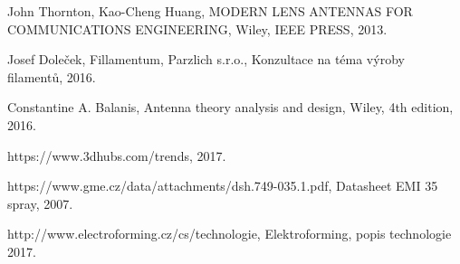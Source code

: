 
\begin{thebibliography}{9}

  John Thornton,
  Kao-Cheng Huang,
  MODERN LENS ANTENNAS FOR COMMUNICATIONS ENGINEERING,
  Wiley,
  IEEE PRESS,
  2013.

  Josef Doleček,
  Fillamentum,
  Parzlich s.r.o.,
  Konzultace na téma výroby filamentů,
  2016.

  Constantine A. Balanis,
  Antenna theory analysis and design,
  Wiley,
  4th edition,
  2016.

  https://www.3dhubs.com/trends,
  2017.

  https://www.gme.cz/data/attachments/dsh.749-035.1.pdf,
  Datasheet EMI 35 spray,
  2007.

  http://www.electroforming.cz/cs/technologie,
  Elektroforming, popis technologie 
  2017.
  

\end{thebibliography}

\newpage

\listoffigures

\newpage

\listoftables
